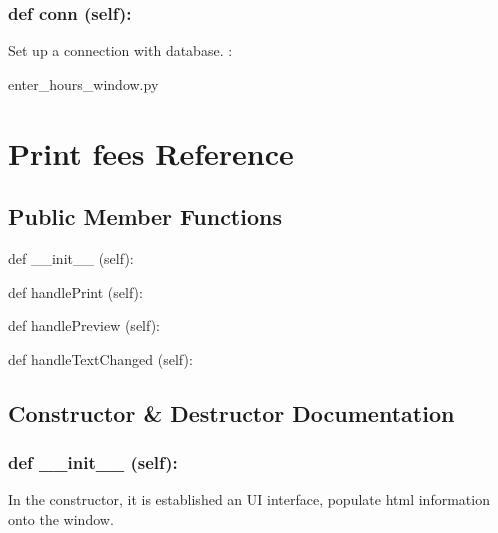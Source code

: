\hypertarget{class_poly_a14a7ad77ce612b0c54f531d307ee4b39}{
\subsubsection[{def conn (self):}]{\setlength{\rightskip}{0pt plus 5cm}def {conn} (self):}}\label{class_poly_a14a7ad77ce612b0c54f531d307ee4b39}
Set up a connection with database.
:\begin{DoxyCompactItemize}
\item 
enter\_hours\_window.\-py\end{DoxyCompactItemize}



\hypertarget{Print_fees}{\section{Print fees Reference}
\label{Print_fees}
}
\subsection*{Public Member Functions}
\begin{DoxyCompactItemize}
\item 
def {\_\_init\_\_} (self):
\item 
def {handlePrint} (self):
\item 
def {handlePreview} (self):
\item 
def {handleTextChanged} (self):

\end{DoxyCompactItemize}

\subsection{Constructor \& Destructor Documentation}
\hypertarget{class_poly_aa3def076b74bed67904976ad4f9fe9b1}{
\subsubsection[{def __init__ (self):}]{\setlength{\rightskip}{0pt plus 5cm}def {\_\_init\_\_} (self): 
}}
In the constructor, it is established an UI interface, populate html information onto the window. 

